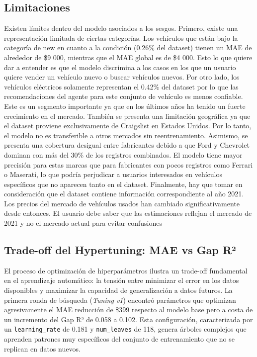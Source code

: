 \documentclass[conference]{IEEEtran}
\begin{document}
\subsection{Limitaciones}
Existen límites dentro del modelo asociados a los sesgos. Primero, existe una representación limitada de ciertas categorías.  Los vehículos que están bajo la categoría de new en cuanto a la condición (0.26\% del dataset) tienen un MAE de alrededor de \$9 000, mientras que el  MAE global es de \$4 000. Esto lo que quiere dar a entender es que el modelo  discrimina a los casos en los que un usuario quiere vender un vehículo nuevo o buscar vehículos nuevos. Por otro lado, los vehículos eléctricos solamente representan el 0.42\% del dataset por lo que las recomendaciones del agente para este conjunto de vehículo es menos confiable. Este es un segmento importante ya que en los  últimos años ha tenido un fuerte crecimiento en el mercado. También se presenta una limitación geográfica ya que el dataset proviene exclusivamente de Craigslist en Estados Unidos. Por lo tanto, el modelo no es transferible a otros mercados sin reentrenamiento. Asimismo, se presenta una cobertura desigual entre fabricantes debido a que Ford y Chevrolet dominan con más del 30\% de los registros combinados. El modelo tiene mayor precisión para estas marcas que para fabricantes con pocos registros como Ferrari o Maserati, lo que podría perjudicar a usuarios interesados en vehículos específicos que no aparecen tanto en el dataset. Finalmente, hay que tomar en consideración que el dataset contiene información correspondiente al año 2021. Los precios del mercado de vehículos usados han cambiado significativamente desde entonces. El usuario debe saber que las estimaciones reflejan el mercado de 2021 y no el mercado actual para evitar confusiones

\subsection{Trade-off del Hypertuning: MAE vs Gap R²}
\label{subsec:disc_hypertuning}
El proceso de optimización de hiperparámetros ilustra un trade-off  fundamental en el aprendizaje automático: la tensión entre minimizar el error en los datos disponibles y maximizar la capacidad de generalización a datos futuros. La primera ronda de búsqueda (\textit{Tuning v1}) encontró parámetros que optimizan agresivamente el MAE reducción de \$399 respecto al modelo base pero a costa de un incremento del Gap R² de 0.058 a 0.102. Esta configuración, caracterizada por un \texttt{learning\_rate} de 0.181 y \texttt{num\_leaves} de 118, genera árboles complejos que aprenden patrones muy específicos del conjunto de entrenamiento que no se replican en datos nuevos.
\end{document}

